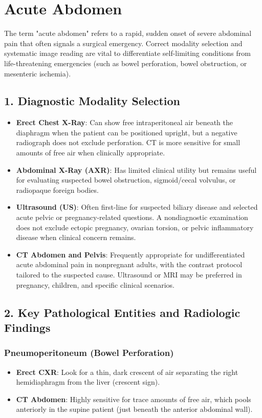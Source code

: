 \chapter{Acute Abdomen}

\label{ch:acute_abdomen}

The term "acute abdomen" refers to a rapid, sudden onset of severe abdominal pain that often signals a surgical emergency. Correct modality selection and systematic image reading are vital to differentiate self-limiting conditions from life-threatening emergencies (such as bowel perforation, bowel obstruction, or mesenteric ischemia).


\section*{1. Diagnostic Modality Selection}
\begin{itemize}
    \item \textbf{Erect Chest X-Ray}: Can show free intraperitoneal air beneath the diaphragm when the patient can be positioned upright, but a negative radiograph does not exclude perforation. CT is more sensitive for small amounts of free air when clinically appropriate.
    \item \textbf{Abdominal X-Ray (AXR)}: Has limited clinical utility but remains useful for evaluating suspected bowel obstruction, sigmoid/cecal volvulus, or radiopaque foreign bodies.
    \item \textbf{Ultrasound (US)}: Often first-line for suspected biliary disease and selected acute pelvic or pregnancy-related questions. A nondiagnostic examination does not exclude ectopic pregnancy, ovarian torsion, or pelvic inflammatory disease when clinical concern remains.
    \item \textbf{CT Abdomen and Pelvis}: Frequently appropriate for undifferentiated acute abdominal pain in nonpregnant adults, with the contrast protocol tailored to the suspected cause. Ultrasound or MRI may be preferred in pregnancy, children, and specific clinical scenarios.
\end{itemize}


\section*{2. Key Pathological Entities and Radiologic Findings}

\subsection*{Pneumoperitoneum (Bowel Perforation)}
\begin{itemize}
    \item \textbf{Erect CXR}: Look for a thin, dark crescent of air separating the right hemidiaphragm from the liver (crescent sign).
    \item \textbf{CT Abdomen}: Highly sensitive for trace amounts of free air, which pools anteriorly in the supine patient (just beneath the anterior abdominal wall).
\end{itemize}

